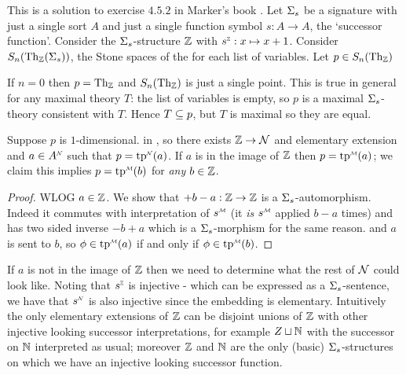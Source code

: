 \begin{eg}
    This is a solution to exercise $4.5.2$ 
    in Marker's book \cite{marker}. 
    Let $\Sigma_s$ be a signature with just a single sort $A$ and just 
    a single function symbol $s : A \to A$, the `successor function'. 
    Consider the $\Sigma_s$-structure $\mathbb{Z}$ with 
    $\modintp{\Z}{s} : x \mapsto x + 1$.
    Consider $S_n(\mathrm{Th}_{\mathbb{Z}}(\Sigma_s))$, the Stone spaces of the 
     for each list of variables.
    Let $p \in S_n(\mathrm{Th}_{\mathbb{Z}})$
    
    If $n = 0$ then $p = \mathrm{Th}_{\mathbb{Z}}$ and 
    $S_n(\mathrm{Th}_{\mathbb{Z}})$ is just a single point.
    This is true in general for any maximal theory $T$: 
    the list of variables is empty, so $p$ is a maximal $\Sigma_s$-theory 
    consistent with $T$. Hence $T \subseteq p$, 
    but $T$ is maximal so they are equal.

    Suppose $p$ is $1$-dimensional.
    in ,
    so there exists $\mathbb{Z} \to \mathcal{N}$ and elementary extension 
    and $a \in \nnintp{A}$ such that $p = \nnintp{\tp}(a)$.
    If $a$ is in the image of $\mathbb{Z}$ then $p = \mmintp{\tp}(a)$;
    we claim this implies $p = \mmintp{\tp}(b)$ for \textit{any} $b \in \mathbb{Z}$.

    \begin{proof}
        WLOG $a \in \mathbb{Z}$. 
        We show that $+ b - a : \mathbb{Z} \to \mathbb{Z}$ is a $\Sigma_s$-automorphism.
        Indeed it commutes with interpretation of $\mmintp{s}$ 
        (it \textit{is} $\mmintp{s}$ applied $b - a$ times) and
        has two sided inverse $- b + a$ which is a $\Sigma_s$-morphism 
        for the same reason.
        and $a$ is sent to $b$, 
        so $\phi \in \mmintp{\tp}(a)$ if and only if $\phi \in \mmintp{\tp}(b)$.
    \end{proof}
    If $a$ is not in the image of $\mathbb{Z}$ then we need to determine what 
    the rest of $\mathcal{N}$ could look like.
    Noting that $\modintp{\Z}{s}$ is injective - 
    which can be expressed as a $\Sigma_s$-sentence, 
    we have that $\nnintp{s}$ is also injective since 
    the embedding is elementary.
    Intuitively the only elementary extensions of $\mathbb{Z}$ can be 
    disjoint unions of $\mathbb{Z}$ with other injective looking successor 
    interpretations, for example $Z \sqcup \mathbb{N}$ with the successor on $\mathbb{N}$ 
    interpreted as usual;
    moreover $\mathbb{Z}$ and $\mathbb{N}$ are the only (basic) $\Sigma_s$-structures on which 
    we have an injective looking successor function.
    

\end{eg}
